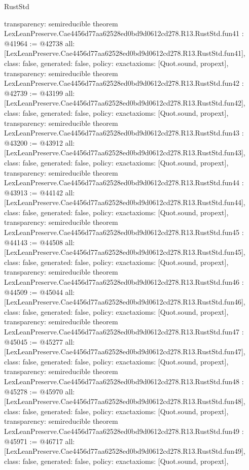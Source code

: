 \begin{lexlean}{RustStd}
\begin{coremodule}
{  transparency: semireducible
}
theorem LexLeanPreserve.Cae4456d77aa62528ed0bd9d0612cd278.R13.RustStd.fun41 : @41964 := @42738 {
  all: [LexLeanPreserve.Cae4456d77aa62528ed0bd9d0612cd278.R13.RustStd.fun41],
  class: false,
  generated: false,
  policy: exact{axioms: [Quot.sound, propext]},
  transparency: semireducible
}
theorem LexLeanPreserve.Cae4456d77aa62528ed0bd9d0612cd278.R13.RustStd.fun42 : @42739 := @43199 {
  all: [LexLeanPreserve.Cae4456d77aa62528ed0bd9d0612cd278.R13.RustStd.fun42],
  class: false,
  generated: false,
  policy: exact{axioms: [Quot.sound, propext]},
  transparency: semireducible
}
theorem LexLeanPreserve.Cae4456d77aa62528ed0bd9d0612cd278.R13.RustStd.fun43 : @43200 := @43912 {
  all: [LexLeanPreserve.Cae4456d77aa62528ed0bd9d0612cd278.R13.RustStd.fun43],
  class: false,
  generated: false,
  policy: exact{axioms: [Quot.sound, propext]},
  transparency: semireducible
}
theorem LexLeanPreserve.Cae4456d77aa62528ed0bd9d0612cd278.R13.RustStd.fun44 : @43913 := @44142 {
  all: [LexLeanPreserve.Cae4456d77aa62528ed0bd9d0612cd278.R13.RustStd.fun44],
  class: false,
  generated: false,
  policy: exact{axioms: [Quot.sound, propext]},
  transparency: semireducible
}
theorem LexLeanPreserve.Cae4456d77aa62528ed0bd9d0612cd278.R13.RustStd.fun45 : @44143 := @44508 {
  all: [LexLeanPreserve.Cae4456d77aa62528ed0bd9d0612cd278.R13.RustStd.fun45],
  class: false,
  generated: false,
  policy: exact{axioms: [Quot.sound, propext]},
  transparency: semireducible
}
theorem LexLeanPreserve.Cae4456d77aa62528ed0bd9d0612cd278.R13.RustStd.fun46 : @44509 := @45044 {
  all: [LexLeanPreserve.Cae4456d77aa62528ed0bd9d0612cd278.R13.RustStd.fun46],
  class: false,
  generated: false,
  policy: exact{axioms: [Quot.sound, propext]},
  transparency: semireducible
}
theorem LexLeanPreserve.Cae4456d77aa62528ed0bd9d0612cd278.R13.RustStd.fun47 : @45045 := @45277 {
  all: [LexLeanPreserve.Cae4456d77aa62528ed0bd9d0612cd278.R13.RustStd.fun47],
  class: false,
  generated: false,
  policy: exact{axioms: [Quot.sound, propext]},
  transparency: semireducible
}
theorem LexLeanPreserve.Cae4456d77aa62528ed0bd9d0612cd278.R13.RustStd.fun48 : @45278 := @45970 {
  all: [LexLeanPreserve.Cae4456d77aa62528ed0bd9d0612cd278.R13.RustStd.fun48],
  class: false,
  generated: false,
  policy: exact{axioms: [Quot.sound, propext]},
  transparency: semireducible
}
theorem LexLeanPreserve.Cae4456d77aa62528ed0bd9d0612cd278.R13.RustStd.fun49 : @45971 := @46717 {
  all: [LexLeanPreserve.Cae4456d77aa62528ed0bd9d0612cd278.R13.RustStd.fun49],
  class: false,
  generated: false,
  policy: exact{axioms: [Quot.sound, propext]},
}
\end{coremodule}
\end{lexlean}
